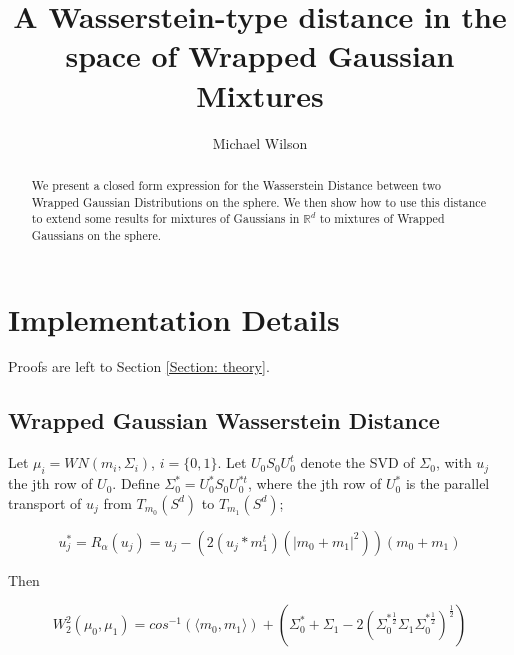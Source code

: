 \documentclass[]{article}
\title{A Wasserstein-type distance in the space of Wrapped Gaussian Mixtures}
\author{Michael Wilson}
\date{}
\begin{document}
	
	\maketitle
	
	\begin{abstract}
	We present a closed form expression for the Wasserstein Distance between two Wrapped Gaussian Distributions on the sphere. We then show how to use this distance to extend some results for mixtures of Gaussians in $\mathbb{R}^d$ to mixtures of Wrapped Gaussians on the sphere.  
	\end{abstract}


\section{Implementation Details}

Proofs are left to Section \ref{Section: theory}.

\subsection{Wrapped Gaussian Wasserstein Distance}

Let $\mu_i = WN(m_i,\Sigma_i)$, $i = \{0, 1\}$. Let $U_0 S_0 U_0^t$ denote the SVD of $\Sigma_0$, with $u_j$ the jth row of $U_0$. Define $\Sigma_0^* = U_0^* S_0 U_0^{*t}$, where the jth row of $U_0^*$ is the parallel transport of $u_j$ from $T_{m_0}(S^d)$ to $T_{m_1}(S^d)$;

%

\begin{equation*}
	u_j^{*} = R_\alpha(u_j) = u_j - (2(u_j*m_1^t)(|m_0 +m_1|^2))(m_0 + m_1)
\end{equation*} 

Then 

\begin{equation*}
	W_2^2(\mu_0,\mu_1) = cos^{-1}(\langle m_0,m_1 \rangle) + (\Sigma_0^* + \Sigma_1 - 2 (\Sigma_0^{*\frac{1}{2}} \Sigma_1 \Sigma_0^{*\frac{1}{2}})^{\frac{1}{2}}) 
\end{equation*}
\end{document}

